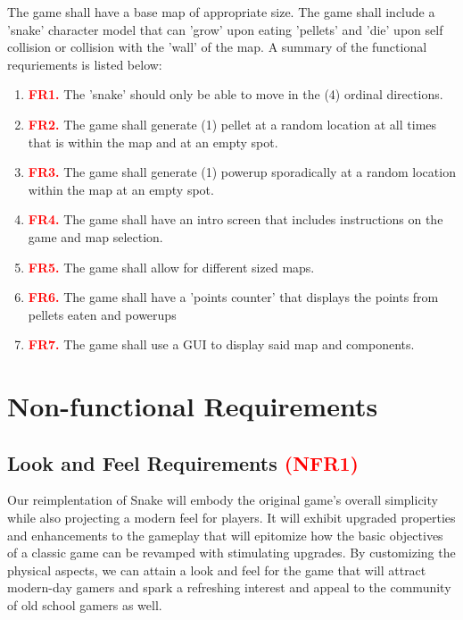 \documentclass[12pt, titlepage]{article}
\begin{document}
The game shall have a base map of appropriate size.
The game shall include a 'snake' character model that can 'grow' upon eating 'pellets' and 'die' upon self collision or collision with the 'wall' of the map. A summary of the functional requriements is listed below:\\
\begin{enumerate}
\item \textcolor{red}{\textbf{FR1.}}\label{FR1} The 'snake' should only be able to move in the (4) ordinal directions. 
\item \textcolor{red}{\textbf{FR2.}}\label{FR2} The game shall generate (1) pellet at a random location at all times that is within the map and at an empty spot. 
\item \textcolor{red}{\textbf{FR3.}}\label{FR3} The game shall generate (1) powerup sporadically at a random location within the map at an empty spot. 
\item \textcolor{red}{\textbf{FR4.}}\label{FR4} The game shall have an intro screen that includes instructions on the game and map selection.
\item \textcolor{red}{\textbf{FR5.}}\label{FR5} The game shall allow for different sized maps.
\item \textcolor{red}{\textbf{FR6.}}\label{FR6} The game shall have a 'points counter' that displays the points from pellets eaten and powerups
\item \textcolor{red}{\textbf{FR7.}}\label{FR7} The game shall use a GUI to display said map and components.
\end{enumerate}




\section{Non-functional Requirements}

\subsection{Look and Feel Requirements \textcolor{red}{(\textbf{NFR1})}\label{NFR1}} 
Our reimplentation of Snake will embody the original game's overall simplicity while also projecting a modern feel for players. It will exhibit upgraded properties and enhancements to the gameplay that will epitomize how the basic objectives of a classic game can be revamped with stimulating upgrades. By customizing the physical aspects, we can attain a look and feel for the game that will attract modern-day gamers and spark a refreshing interest and appeal to the community of old school gamers as well. 
\end{document}
